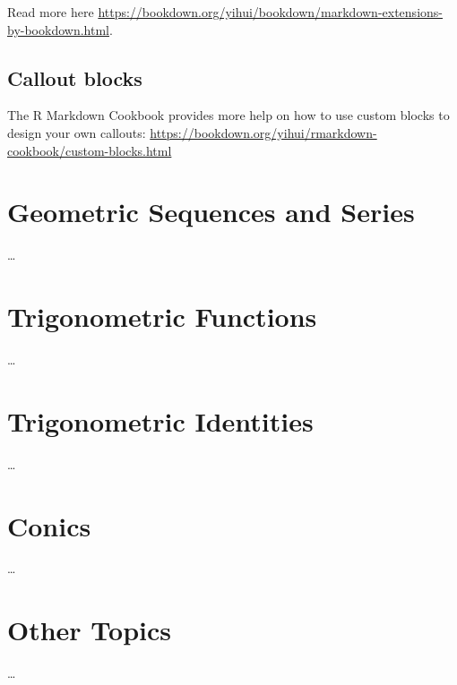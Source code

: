 \documentclass[
]{book}
\theoremstyle{definition}
\theoremstyle{definition}
\theoremstyle{definition}
\theoremstyle{definition}
\theoremstyle{remark}
\begin{document}
Read more here \url{https://bookdown.org/yihui/bookdown/markdown-extensions-by-bookdown.html}.

\hypertarget{callout-blocks}{%
\section{Callout blocks}\label{callout-blocks}}

The R Markdown Cookbook provides more help on how to use custom blocks to design your own callouts: \url{https://bookdown.org/yihui/rmarkdown-cookbook/custom-blocks.html}

\hypertarget{geometric-sequences-and-series}{%
\chapter{Geometric Sequences and Series}\label{geometric-sequences-and-series}}

\ldots{}

\hypertarget{trigonometric-functions}{%
\chapter{Trigonometric Functions}\label{trigonometric-functions}}

\ldots{}

\hypertarget{trigonometric-identities}{%
\chapter{Trigonometric Identities}\label{trigonometric-identities}}

\ldots{}

\hypertarget{conics}{%
\chapter{Conics}\label{conics}}

\ldots{}

\hypertarget{other-topics}{%
\chapter{Other Topics}\label{other-topics}}

\ldots{}
\end{document}
